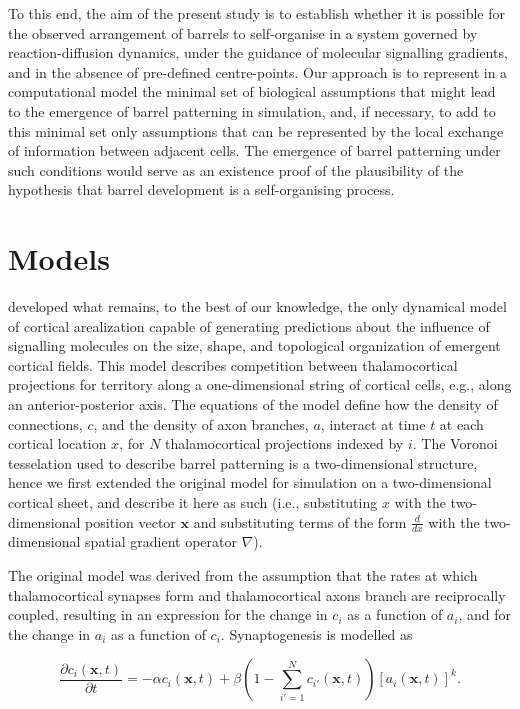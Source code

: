 \documentclass[a4paper,11pt]{article}
\newcommand{\mb}[1]{\mathbf{#1}}
\begin{document}
To this end, the aim of the present study is to establish whether it is
possible for the observed arrangement of barrels to self-organise in a system
governed by reaction-diffusion dynamics, under the guidance of molecular
signalling gradients, and in the absence of pre-defined centre-points. Our
approach is to represent in a computational model the minimal set of
biological assumptions that might lead to the emergence of barrel patterning
in simulation, and, if necessary, to add to this minimal set only assumptions
that can be represented by the local exchange of information between adjacent
cells. The emergence of barrel patterning under such conditions would serve as
an existence proof of the plausibility of the hypothesis that barrel
development is a self-organising process.

\section*{Models}

\cite{Karbowski2004} developed what remains, to the best of our knowledge, the
only dynamical model of cortical arealization capable of generating
predictions about the influence of signalling molecules on the size, shape,
and topological organization of emergent cortical fields. This model describes
competition between thalamocortical projections for territory along a
one-dimensional string of cortical cells, e.g., along an anterior-posterior
axis. The equations of the model define how the density of connections, $c$,
and the density of axon branches, $a$, interact at time $t$ at each cortical
location $x$, for $N$ thalamocortical projections indexed by $i$. The Voronoi
tesselation used to describe barrel patterning is a two-dimensional structure,
hence we first extended the original model for simulation on a two-dimensional
cortical sheet, and describe it here as such (i.e., substituting $x$ with the
two-dimensional position vector $\mb{x}$ and substituting terms of the form
$\frac{d}{dx}$ with the two-dimensional spatial gradient operator $\nabla$).

The original model was derived from the assumption that the rates at which
thalamocortical synapses form and thalamocortical axons branch are
reciprocally coupled, resulting in an expression for the change in $c_i$ as a
function of $a_i$, and for the change in $a_i$ as a function of
$c_i$. Synaptogenesis is modelled as

\begin{equation} \label{eq:Karb2DExt_dc}
\frac{\partial c_i(\mb{x},t)}{\partial t} =-\alpha c_i(\mb{x},t) +\beta  \left(1 - \sum_{i'=1}^{N} c_{i'}(\mb{x}, t)\right)[a_i(\mb{x},t)]^k.
\end{equation}
\end{document}
